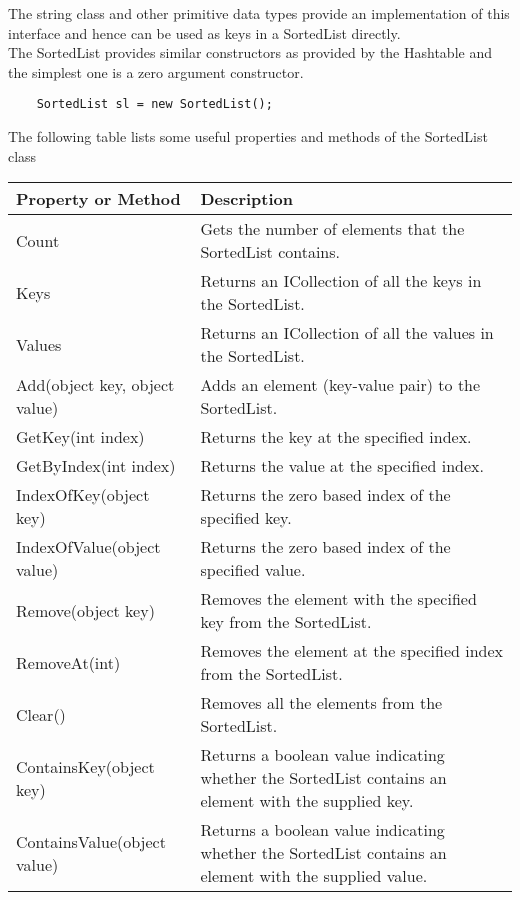 The string class and other primitive data types provide an implementation of this interface and hence can be used
as keys in a SortedList directly.\\

The SortedList provides similar constructors as provided by the Hashtable and the simplest one is a zero argument
constructor.

\begin{lstlisting}
    SortedList sl = new SortedList();    
\end{lstlisting}

The following table lists some useful properties and methods of the SortedList class

\begin{center}
    \begin{tabular}{ | m{5em} | m{10cm} | } 
    \hline
    Property or Method & Description \\
    \hline
    Count & Gets the number of elements that the SortedList contains.\\
    Keys & Returns an ICollection of all the keys in the SortedList.\\
    Values & Returns an ICollection of all the values in the SortedList.\\
    Add(object key, object value) & Adds an element (key-value pair) to the SortedList.\\
    GetKey(int index) & Returns the key at the specified index.\\
    GetByIndex(int index) & Returns the value at the specified index.\\
    IndexOfKey(object key) & Returns the zero based index of the specified key.\\
    IndexOfValue(object value) & Returns the zero based index of the specified value.\\
    Remove(object key) & Removes the element with the specified key from the SortedList.\\
    RemoveAt(int) & Removes the element at the specified index from the SortedList.\\
    Clear() & Removes all the elements from the SortedList.\\
    ContainsKey(object key) & Returns a boolean value indicating whether the SortedList contains an element
    with the supplied key.\\
    ContainsValue(object value) & Returns a boolean value indicating whether the SortedList contains an element
    with the supplied value.\\
    \hline
    \end{tabular}
\end{center}

